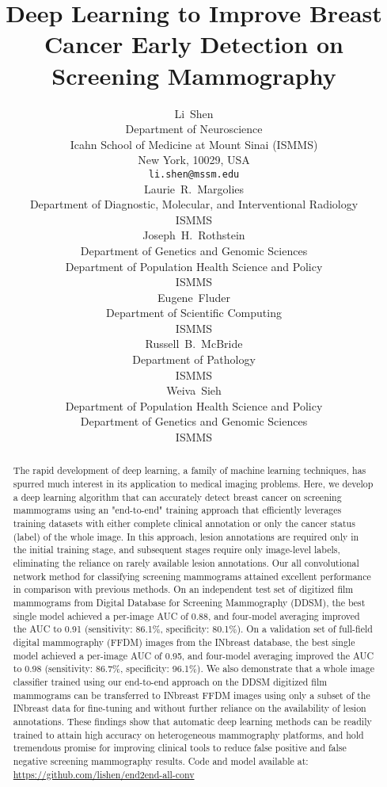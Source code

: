 \documentclass[12pt,letterpaper]{article}
\title{Deep Learning to Improve Breast Cancer Early Detection on Screening Mammography}
\author{
  Li~Shen \\
  Department of Neuroscience \\
  Icahn School of Medicine at Mount Sinai (ISMMS) \\
  New York, 10029, USA \\
  \texttt{li.shen@mssm.edu} \\
\And
  Laurie~R.~Margolies \\
  Department of Diagnostic, Molecular, and Interventional Radiology \\
  ISMMS \\
  \And
  Joseph~H.~Rothstein \\
  Department of Genetics and Genomic Sciences \\
  Department of Population Health Science and Policy \\
  ISMMS \\
  \And
  Eugene~Fluder \\
  Department of Scientific Computing \\
  ISMMS \\
  \And
  Russell~B.~McBride \\
  Department of Pathology \\
  ISMMS \\
  \And
  Weiva~Sieh \\
  Department of Population Health Science and Policy \\
  Department of Genetics and Genomic Sciences \\
  ISMMS
}
\begin{document}
\maketitle

\begin{abstract}
The rapid development of deep learning, a family of machine learning techniques, has spurred much interest in its application to medical imaging problems. Here, we develop a deep learning algorithm that can accurately detect breast cancer on screening mammograms using an "end-to-end" training approach that efficiently leverages training datasets with either complete clinical annotation or only the cancer status (label) of the whole image. In this approach, lesion annotations are required only in the initial training stage, and subsequent stages require only image-level labels, eliminating the reliance on rarely available lesion annotations. Our all convolutional network method for classifying screening mammograms attained excellent performance in comparison with previous methods. On an independent test set of digitized film mammograms from Digital Database for Screening Mammography (DDSM), the best single model achieved a per-image AUC of 0.88, and four-model averaging improved the AUC to 0.91 (sensitivity: 86.1\%, specificity: 80.1\%). On a validation set of full-field digital mammography (FFDM) images from the INbreast database, the best single model achieved a per-image AUC of 0.95, and four-model averaging improved the AUC to 0.98 (sensitivity: 86.7\%, specificity: 96.1\%). We also demonstrate that a whole image classifier trained using our end-to-end approach on the DDSM digitized film mammograms can be transferred to INbreast FFDM images using only a subset of the INbreast data for fine-tuning and without further reliance on the availability of lesion annotations. These findings show that automatic deep learning methods can be readily trained to attain high accuracy on heterogeneous mammography platforms, and hold tremendous promise for improving clinical tools to reduce false positive and false negative screening mammography results. Code and model available at: \url{https://github.com/lishen/end2end-all-conv}
\end{abstract}
\end{document}
